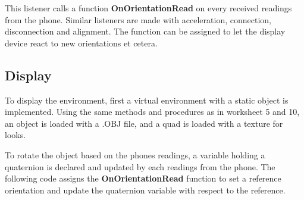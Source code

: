 
This listener calls a function \textbf{OnOrientationRead} on every received readings from the phone.
Similar listeners are made with acceleration, connection, disconnection and alignment.
The function can be assigned to let the display device react to new orientations et cetera.


\subsection{Display}
To display the environment, first a virtual environment with a static object is implemented.
Using the same methods and procedures as in worksheet 5 and 10, an object is loaded with a .OBJ file, and a quad is loaded with a texture for looks.

To rotate the object based on the phones readings, a variable holding a quaternion is declared and updated by each readings from the phone.
The following code assigns the \textbf{OnOrientationRead} function to set a reference orientation and update the quaternion variable with respect to the reference.

